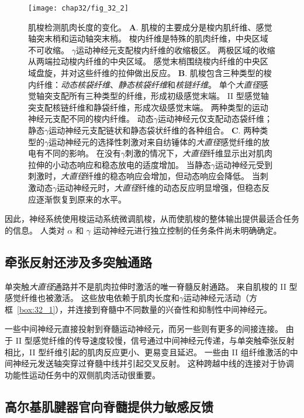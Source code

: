 \begin{figure}[htbp]
	\centering
	\texttt{[image: chap32/fig\_32\_2]}
	\caption{肌梭检测肌肉长度的变化。
	\textbf{A}. 肌梭的主要成分是梭内肌纤维、感觉轴突末梢和运动轴突末梢。
	梭内纤维是特殊的肌肉纤维，中央区域不可收缩。
	$ \gamma $运动神经元支配梭内纤维的收缩极区。
	两极区域的收缩从两端拉动梭内纤维的中央区域。
	感觉末梢围绕梭内纤维的中央区域盘旋，并对这些纤维的拉伸做出反应\cite{hulliger1984mammalian}。
	\textbf{B}. 肌梭包含三种类型的梭内纤维：\textit{动态核袋纤维}、\textit{静态核袋纤维}和\textit{核链纤维}。
	单个\textit{大直径}感觉轴突支配所有三种类型的纤维，形成初级感觉末端。
	II 型感觉轴突支配核链纤维和静袋纤维，形成次级感觉末端。
	两种类型的运动神经元支配不同的梭内纤维。
	动态$ \gamma $运动神经元仅支配动态袋纤维；
	静态$ \gamma $运动神经元支配链状和静态袋状纤维的各种组合\cite{boyd1980isolated}。
	\textbf{C}. 两种类型的$ \gamma $运动神经元的选择性刺激对来自纺锤体的\textit{大直径}感觉纤维的放电有不同的影响。
	在没有$ \gamma $刺激的情况下，\textit{大直径}纤维显示出对肌肉拉伸的小动态响应和稳态放电的适度增加。
	当静态$ \gamma $运动神经元受到刺激时，\textit{大直径}纤维的稳态响应会增加，但动态响应会降低。
	当刺激动态$ \gamma $运动神经元时，\textit{大直径}纤维的动态反应明显增强，但稳态反应逐渐恢复到原来的水平\cite{brown1966subdivision}。}
	\label{fig:32_2}
\end{figure}


因此，神经系统使用梭运动系统微调肌梭，从而使肌梭的整体输出提供最适合任务的信息。
人类对 $ \alpha $ 和 $ \gamma $ 运动神经元进行独立控制的任务条件尚未明确确定。



\subsection{牵张反射还涉及多突触通路}

单突触\textit{大直径}通路并不是肌肉拉伸时激活的唯一脊髓反射通路。
来自肌梭的 II 型感觉纤维也被激活。
这些放电依赖于肌肉长度和$ \gamma $运动神经元活动（方框~\ref{box:32_1}），并连接到脊髓中不同数量的兴奋性和抑制性中间神经元。


一些中间神经元直接投射到脊髓运动神经元，而另一些则有更多的间接连接。
由于 II 型感觉纤维的传导速度较慢，信号通过中间神经元传递，与单突触牵张反射相比，II 型纤维引起的肌肉反应更小、更易变且延迟。
一些由 II 组纤维激活的中间神经元发送轴突穿过脊髓中线并引起交叉反射。
这种跨越中线的连接对于协调功能性运动任务中的双侧肌肉活动很重要。



\subsection{高尔基肌腱器官向脊髓提供力敏感反馈}

